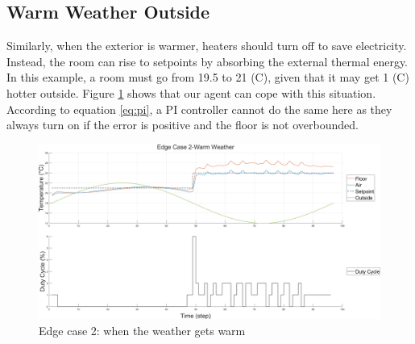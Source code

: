 \documentclass[../main.tex]{subfiles}
\begin{document}
\subsection{Warm Weather Outside}
Similarly, when the exterior is warmer, heaters should turn off to save electricity. Instead, the room can rise to setpoints by absorbing the external thermal energy. In this example, a room must go from 19.5 to 21 (\degree C), given that it may get 1 (\degree C) hotter outside. Figure \ref{fig:edge_2} shows that our agent can cope with this situation. According to equation \ref{eq:pi}, a PI controller cannot do the same here as they always turn on if the error is positive and the floor is not overbounded.
\begin{figure}[htbp]
    \centering
    \includegraphics[width=1\linewidth]{figures/EdgeCase2-WarmWeather.png}
    \caption{Edge case 2: when the weather gets warm}
    \label{fig:edge_2}
\end{figure}
\end{document}
